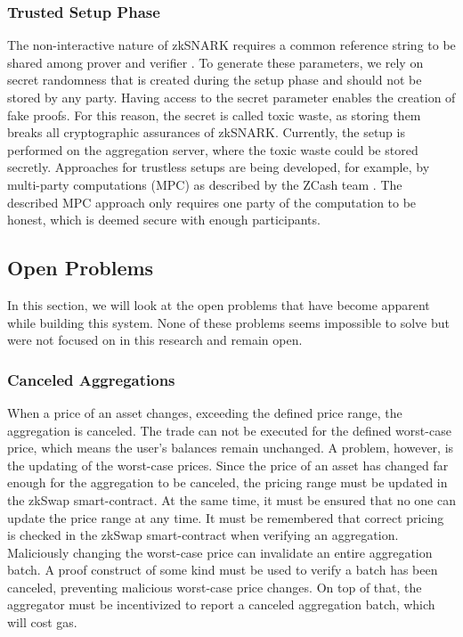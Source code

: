 \documentclass[../../thesis.tex]{subfiles}
\begin{document}
\subsubsection{Trusted Setup Phase} \label{setup}
The non-interactive nature of zkSNARK requires a common reference string to be shared among prover and verifier \cite{zcash_2019}. To generate these parameters, we rely on secret randomness that is created during the setup phase and should not be stored by any party. Having access to the secret parameter enables the creation of fake proofs. For this reason, the secret is called toxic waste, as storing them breaks all cryptographic assurances of zkSNARK. Currently, the setup is performed on the aggregation server, where the toxic waste could be stored secretly. Approaches for trustless setups are being developed,  for example, by multi-party computations (MPC) as described by the ZCash team \cite{zcash_2019}. The described MPC approach only requires one party of the computation to be honest, which is deemed secure with enough participants.

\subsection{Open Problems}
In this section, we will look at the open problems that have become apparent while building this system. None of these problems seems impossible to solve but were not focused on in this research and remain open. 

\subsubsection{Canceled Aggregations} \label{canceled_aggregation}
When a price of an asset changes, exceeding the defined price range, the aggregation is canceled. The trade can not be executed for the defined worst-case price, which means the user's balances remain unchanged. A problem, however, is the updating of the worst-case prices. Since the price of an asset has changed far enough for the aggregation to be canceled, the pricing range must be updated in the zkSwap smart-contract. At the same time, it must be ensured that no one can update the price range at any time. It must be remembered that correct pricing is checked in the zkSwap smart-contract when verifying an aggregation. Maliciously changing the worst-case price can invalidate an entire aggregation batch. A proof construct of some kind must be used to verify a batch has been canceled, preventing malicious worst-case price changes. On top of that, the aggregator must be incentivized to report a canceled aggregation batch, which will cost gas.
\end{document}
